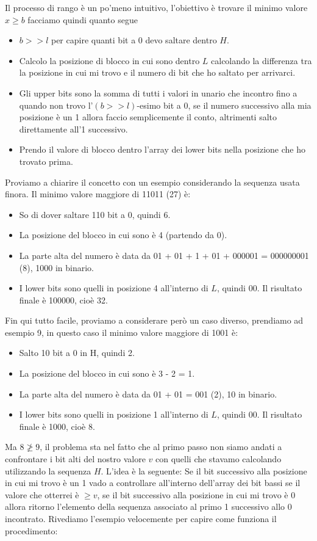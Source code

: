 Il processo di rango è un po'meno intuitivo, l'obiettivo è trovare il minimo valore $x \geq b$ facciamo quindi quanto segue
\begin{itemize}
    \item $b >> l$ per capire quanti bit a 0 devo saltare dentro $H$.
    \item Calcolo la posizione di blocco in cui sono dentro $L$ calcolando la differenza tra la posizione in cui mi trovo e il numero di bit che ho saltato per arrivarci.
    \item Gli upper bits sono la somma di tutti i valori in unario che incontro fino a quando non trovo l'$(b >> l)$-esimo bit a 0, se il numero successivo alla mia posizione è un 1 allora faccio semplicemente il conto, altrimenti salto direttamente all'1 successivo.
    \item Prendo il valore di blocco dentro l'array dei lower bits nella posizione che ho trovato prima.
\end{itemize}
Proviamo a chiarire il concetto con un esempio considerando la sequenza usata finora. Il minimo valore maggiore di 11011 (27) è:
\begin{itemize}
    \item So di dover saltare 110 bit a 0, quindi 6.
    \item La posizione del blocco in cui sono è 4 (partendo da 0).
    \item La parte alta del numero è data da 01 + 01 + 1 + 01 + 000001 = 000000001 (8), 1000 in binario.
    \item I lower bits sono quelli in posizione 4 all'interno di $L$, quindi 00. Il risultato finale è 100000, cioè 32.
\end{itemize}
Fin qui tutto facile, proviamo a considerare però un caso diverso, prendiamo ad esempio 9, in questo caso il minimo valore maggiore di 1001 è:
\begin{itemize}
    \item Salto 10 bit a 0 in H, quindi 2.
    \item La posizione del blocco in cui sono è 3 - 2 = 1.
    \item La parte alta del numero è data da 01 + 01 = 001 (2), 10 in binario.
    \item I lower bits sono quelli in posizione 1 all'interno di $L$, quindi 00. Il risultato finale è 1000, cioè 8.
\end{itemize}
Ma $8 \ngeq 9$, il problema sta nel fatto che al primo passo non siamo andati a confrontare i bit alti del nostro valore $v$ con quelli che stavamo calcolando utilizzando la sequenza $H$. L'idea è la seguente: Se il bit successivo alla posizione in cui mi trovo è un 1 vado a controllare all'interno dell'array dei bit bassi se il valore che otterrei è $\geq v$, se il bit successivo alla posizione in cui mi trovo è 0 allora ritorno l'elemento della sequenza associato al primo 1 successivo allo 0 incontrato. Rivediamo l'esempio velocemente per capire come funziona il procedimento:
